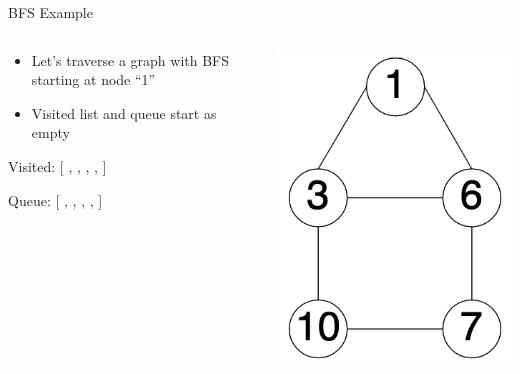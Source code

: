 \documentclass[
  ignorenonframetext,
]{beamer}
\begin{document}
\begin{frame}{BFS Example}
\protect\hypertarget{bfs-example}{}
\begin{columns}[T]
\begin{column}{0.6\textwidth}
\begin{itemize}
\item
  Let's traverse a graph with BFS starting at node ``1''
\item
  Visited list and queue start as empty \vspace{1cm}
\end{itemize}

Visited: {[} , , , , {]}

Queue: {[} , , , , {]}
\end{column}

\begin{column}{0.4\textwidth}
\includegraphics{images/graph-bfs.png}
\end{column}
\end{columns}
\end{frame}
\end{document}
